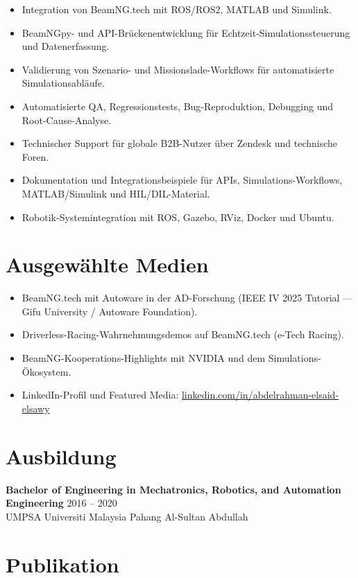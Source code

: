 \documentclass[11pt,a4paper]{article}
\begin{document}
\begin{itemize}
    \item Integration von BeamNG.tech mit ROS/ROS2, MATLAB und Simulink.
    \item BeamNGpy- und API-Brückenentwicklung für Echtzeit-Simulationssteuerung und Datenerfassung.
    \item Validierung von Szenario- und Missionslade-Workflows für automatisierte Simulationsabläufe.
    \item Automatisierte QA, Regressionstests, Bug-Reproduktion, Debugging und Root-Cause-Analyse.
    \item Technischer Support für globale B2B-Nutzer über Zendesk und technische Foren.
    \item Dokumentation und Integrationsbeispiele für APIs, Simulations-Workflows, MATLAB/Simulink und HIL/DIL-Material.
    \item Robotik-Systemintegration mit ROS, Gazebo, RViz, Docker und Ubuntu.
\end{itemize}

\section*{Ausgewählte Medien}

\begin{itemize}
    \item BeamNG.tech mit Autoware in der AD-Forschung (IEEE IV 2025 Tutorial — Gifu University / Autoware Foundation).
    \item Driverless-Racing-Wahrnehmungsdemos auf BeamNG.tech (e-Tech Racing).
    \item BeamNG-Kooperations-Highlights mit NVIDIA und dem Simulations-Ökosystem.
    \item LinkedIn-Profil und Featured Media: \href{https://www.linkedin.com/in/abdelrahman-elsaid-elsawy}{linkedin.com/in/abdelrahman-elsaid-elsawy}
\end{itemize}

\section*{Ausbildung}

\textbf{Bachelor of Engineering in Mechatronics, Robotics, and Automation Engineering}
\hfill 2016 -- 2020\\
UMPSA Universiti Malaysia Pahang Al-Sultan Abdullah

\section*{Publikation}
\end{document}
